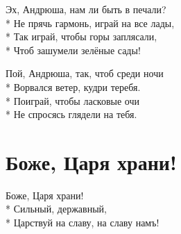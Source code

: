 \medskip

\begin{minipage}{\linewidth}
\hspace*{1.5em}Эх, Андрюша, нам ли быть в печали?\\*
\hspace*{1.5em}Не прячь гармонь, играй на все лады,\\*
\hspace*{1.5em}Так играй, чтобы горы заплясали,\\*
\hspace*{1.5em}Чтоб зашумели зелёные сады!\\
\end{minipage}\par\medskip\nobreak

\medskip

\begin{minipage}{\linewidth}
\hspace*{1.5em}Пой, Андрюша, так, чтоб среди ночи\\*
\hspace*{1.5em}Ворвался ветер, кудри теребя.\\*
\hspace*{1.5em}Поиграй, чтобы ласковые очи\\*
\hspace*{1.5em}Не спросясь глядели на тебя.\\
\end{minipage}

\vspace{\fill}\newpage

\section{Боже, Царя храни!}
\label{song:Боже,_Царя_храни!}

\medskip

\begin{minipage}{\linewidth}
Боже, Царя храни!\\*
Сильный, державный,\\*
Царствуй на славу, на славу намъ!\\
\end{minipage}\par\medskip\nobreak

\medskip

